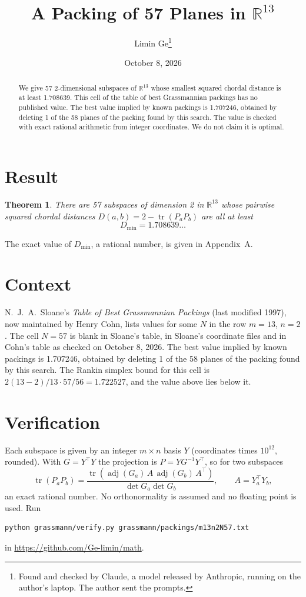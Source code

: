 \documentclass[11pt,a4paper]{article}
\title{A Packing of 57 Planes in $\mathbb{R}^{13}$}
\author{Limin Ge\thanks{Found and checked by Claude, a model released by Anthropic, running on the author's laptop. The author sent the prompts.}}
\date{October 8, 2026}
\newtheorem*{theorem}{Theorem}
\begin{document}
\maketitle
\begin{abstract}
We give 57 2-dimensional subspaces of $\mathbb{R}^{13}$ whose smallest squared chordal distance is at least 1.708639. This cell of the table of best Grassmannian packings has no published value. The best value implied by known packings is 1.707246, obtained by deleting 1 of the 58 planes of the packing found by this search. The value is checked with exact rational arithmetic from integer coordinates. We do not claim it is optimal.
\end{abstract}

\section{Result}
\begin{theorem}
There are 57 subspaces of dimension 2 in $\mathbb{R}^{13}$ whose pairwise squared chordal distances $D(a,b) = 2 - \operatorname{tr}(P_aP_b)$ are all at least
\[ D_{\min} = 1.708639\ldots \]
\end{theorem}
The exact value of $D_{\min}$, a rational number, is given in Appendix~A.


\section{Context}
N.~J.~A.~Sloane's \emph{Table of Best Grassmannian Packings} (last modified 1997), now maintained by Henry Cohn, lists values for some $N$ in the row $m=13$, $n=2$. The cell $N=57$ is blank in Sloane's table, in Sloane's coordinate files and in Cohn's table as checked on October 8, 2026. The best value implied by known packings is 1.707246, obtained by deleting 1 of the 58 planes of the packing found by this search. The Rankin simplex bound for this cell is $2(13-2)/13\cdot 57/56 = 1.722527$, and the value above lies below it.


\section{Verification}
Each subspace is given by an integer $m\times n$ basis $Y$ (coordinates times $10^{12}$, rounded). With $G=Y^\top Y$ the projection is $P=YG^{-1}Y^\top$, so for two subspaces
\[ \operatorname{tr}(P_aP_b)=\frac{\operatorname{tr}(\operatorname{adj}(G_a)\,A\,\operatorname{adj}(G_b)\,A^\top)}{\det G_a\det G_b},\qquad A=Y_a^\top Y_b, \]
an exact rational number. No orthonormality is assumed and no floating point is used. Run
\begin{verbatim}
python grassmann/verify.py grassmann/packings/m13n2N57.txt
\end{verbatim}
in \url{https://github.com/Ge-limin/math}.
\end{document}
